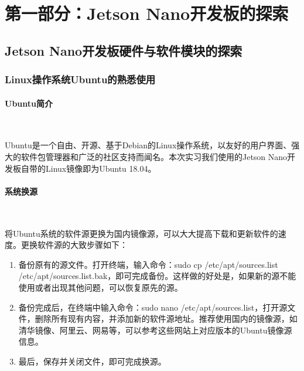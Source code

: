 \documentclass[UTF8]{article}
\begin{document}
\begin{titlepage}

\end{titlepage}

\tableofcontents
\cleardoublepage

%
\section{第一部分：Jetson Nano开发板的探索}

\subsection{Jetson Nano开发板硬件与软件模块的探索}

\subsubsection{Linux操作系统Ubuntu的熟悉使用} 
\paragraph{Ubuntu简介}~{}

Ubuntu是一个自由、开源、基于Debian的Linux操作系统，以友好的用户界面、强大的软件包管理器和广泛的社区支持而闻名。本次实习我们使用的Jetson Nano开发板自带的Linux镜像即为Ubuntu 18.04。

\paragraph{系统换源}~{}

将Ubuntu系统的软件源更换为国内镜像源，可以大大提高下载和更新软件的速度。更换软件源的大致步骤如下：
\begin{enumerate}
    \item 备份原有的源文件。打开终端，输入命令：sudo cp /etc/apt/sources.list /etc/apt/sources.list.bak，即可完成备份。这样做的好处是，如果新的源不能使用或者出现其他问题，可以恢复原先的源。
    \item 备份完成后，在终端中输入命令：sudo nano /etc/apt/sources.list，打开源文件，删除所有现有内容，并添加新的软件源地址。推荐使用国内的镜像源，如清华镜像、阿里云、网易等，可以参考这些网站上对应版本的Ubuntu镜像源信息。
    \item 最后，保存并关闭文件，即可完成换源。
\end{enumerate}
\end{document}
